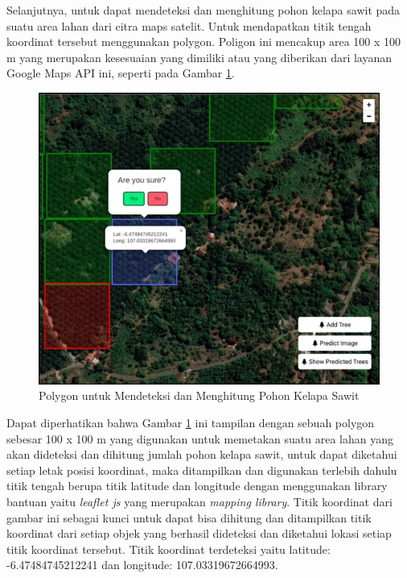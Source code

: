 Selanjutnya, untuk dapat mendeteksi dan menghitung pohon kelapa sawit pada suatu area lahan dari citra maps satelit. Untuk mendapatkan titik tengah koordinat tersebut menggunakan polygon. Poligon ini mencakup area 100 x 100 m yang merupakan kesesuaian yang dimiliki atau yang diberikan dari layanan Google Maps API ini, seperti pada Gambar \ref{img:Polygon-Untuk-Mendeteksi-dan-Menghitung-Pohon-Kelapa}.

\begin{figure}[H]
	\vspace{-0.1cm}
	\begin{center}
		\includegraphics[width=1\columnwidth]{bab4/Gambar/Picture36.jpg}
	\end{center}
	\vspace{-0.2cm}
	\captionsetup{justification=centering}
	\caption{Polygon untuk Mendeteksi dan Menghitung Pohon Kelapa Sawit}\label{img:Polygon-Untuk-Mendeteksi-dan-Menghitung-Pohon-Kelapa}
\end{figure}

Dapat diperhatikan bahwa Gambar \ref{img:Polygon-Untuk-Mendeteksi-dan-Menghitung-Pohon-Kelapa} ini tampilan dengan sebuah polygon sebesar 100 x 100 m yang digunakan untuk memetakan suatu area lahan yang akan dideteksi dan dihitung jumlah pohon kelapa sawit, untuk dapat diketahui setiap letak posisi koordinat, maka ditampilkan dan digunakan terlebih dahulu titik tengah berupa titik latitude dan longitude dengan menggunakan library bantuan yaitu \textit{leaflet js} yang merupakan \textit{mapping library}. Titik koordinat dari gambar ini sebagai kunci untuk dapat bisa dihitung dan ditampilkan titik koordinat dari setiap objek yang berhasil dideteksi dan diketahui lokasi setiap titik koordinat tersebut. Titik koordinat terdeteksi yaitu latitude: -6.47484745212241 dan longitude: 107.03319672664993.

